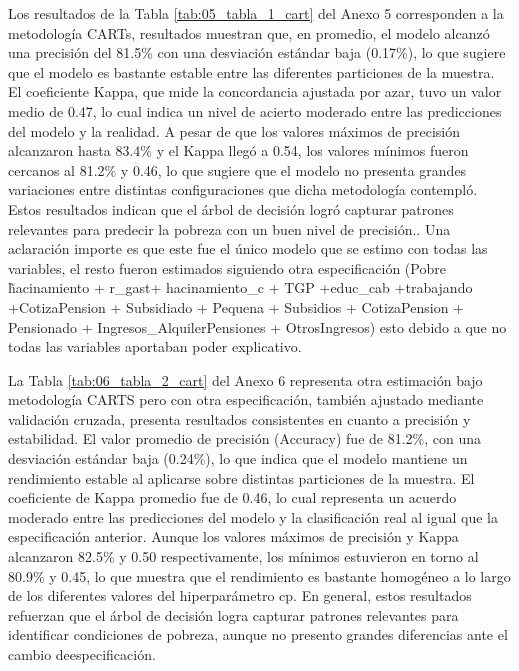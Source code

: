 \documentclass[12pt,a4paper,onecolumn]{article}
\begin{document}
Los resultados de la Tabla \ref{tab:05_tabla_1_cart} del Anexo 5 corresponden a la metodología CARTs, resultados muestran que, en promedio, el modelo alcanzó una precisión del 81.5\% con una desviación estándar baja (0.17\%), lo que sugiere que el modelo es bastante estable entre las diferentes particiones de la muestra. El coeficiente Kappa, que mide la concordancia ajustada por azar, tuvo un valor medio de 0.47, lo cual indica un nivel de acierto moderado entre las predicciones del modelo y la realidad. A pesar de que los valores máximos de precisión alcanzaron hasta 83.4\% y el Kappa llegó a 0.54, los valores mínimos fueron cercanos al 81.2\% y 0.46, lo que sugiere que el modelo no presenta grandes variaciones entre distintas configuraciones que dicha metodología contempló. Estos resultados indican que el árbol de decisión logró capturar patrones relevantes para predecir la pobreza con un buen nivel de precisión.. Una aclaración importe es que este fue el único modelo que se estimo con todas las variables, el resto fueron estimados siguiendo otra especificación (Pobre \~ hacinamiento + r\_gast+ hacinamiento\_c + TGP +educ\_cab +trabajando +CotizaPension + Subsidiado + Pequena + Subsidios + CotizaPension + Pensionado + Ingresos\_AlquilerPensiones + OtrosIngresos) esto debido a que no todas las variables aportaban poder explicativo.

La Tabla \ref{tab:06_tabla_2_cart} del Anexo 6 representa otra estimación bajo metodología CARTS pero con otra especificación, también ajustado mediante validación cruzada, presenta resultados consistentes en cuanto a precisión y estabilidad. El valor promedio de precisión (Accuracy) fue de 81.2\%, con una desviación estándar baja (0.24\%), lo que indica que el modelo mantiene un rendimiento estable al aplicarse sobre distintas particiones de la muestra. El coeficiente de Kappa promedio fue de 0.46, lo cual representa un acuerdo moderado entre las predicciones del modelo y la clasificación real al igual que la especificación anterior. Aunque los valores máximos de precisión y Kappa alcanzaron 82.5\% y 0.50 respectivamente, los mínimos estuvieron en torno al 80.9\% y 0.45, lo que muestra que el rendimiento es bastante homogéneo a lo largo de los diferentes valores del hiperparámetro cp. En general, estos resultados refuerzan que el árbol de decisión logra capturar patrones relevantes para identificar condiciones de pobreza, aunque no presento grandes diferencias ante el cambio deespecificación.
\end{document}
